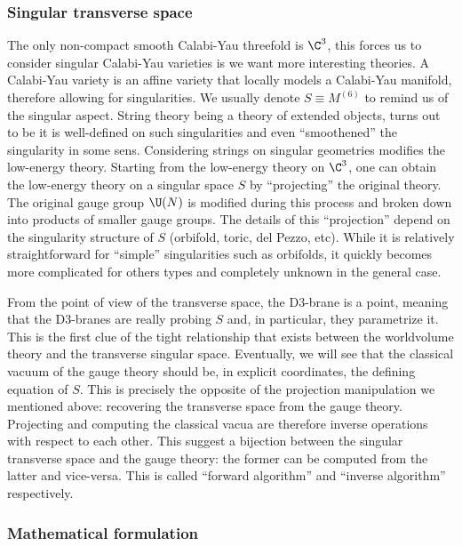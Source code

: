 \documentclass{worksheetclass}
\begin{document}
    \subsubsection*{Singular transverse space}

        The only non-compact smooth Calabi-Yau threefold is $\C^3$, this forces us to consider singular Calabi-Yau varieties is we want more interesting theories. A Calabi-Yau variety is an affine variety that locally models a Calabi-Yau manifold, therefore allowing for singularities. We usually denote $S\equiv M^{(6)}$ to remind us of the singular aspect. String theory being a theory of extended objects, turns out to be it is well-defined on such singularities and even ``smoothened'' the singularity in some sens. Considering strings on singular geometries modifies the low-energy theory. Starting from the low-energy theory on $\C^3$, one can obtain the low-energy theory on a singular space $S$ by ``projecting'' the original theory. The original  gauge group $\U(N)$ is modified during this process and broken down into products of smaller gauge groups. The details of this ``projection'' depend on the singularity structure of $S$ (orbifold, toric, del Pezzo, etc). While it is relatively straightforward for ``simple'' singularities such as orbifolds, it quickly becomes more complicated for others types and completely unknown in the general case.
    
        From the point of view of the transverse space, the D$3$-brane is a point, meaning that the D$3$-branes are really probing $S$ and, in particular, they parametrize it. This is the first clue of the tight relationship that exists between the worldvolume theory and the transverse singular space. Eventually, we will see that the classical vacuum of the gauge theory should be, in explicit coordinates, the defining equation of $S$. This is precisely the opposite of the projection manipulation we mentioned above: recovering the transverse space from the gauge theory. Projecting and computing the classical vacua are therefore inverse operations with respect to each other. This suggest a bijection between the singular transverse space and the gauge theory: the former can be computed from the latter and vice-versa. This is called ``forward algorithm'' and ``inverse algorithm'' respectively.

    \subsubsection*{Mathematical formulation}
\end{document}
